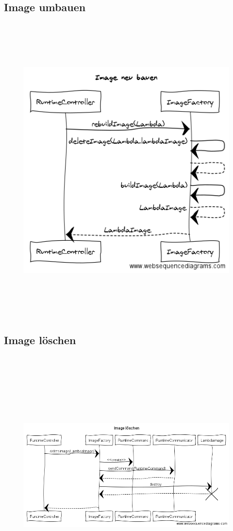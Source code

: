 \documentclass[a4paper,20pt,oneside]{book}
\begin{document}
\subsection{Image umbauen}
	\begin{figure}[!hb]
    \includegraphics[width=18cm,height=16cm]{rebuildImage}
\end{figure}
\newpage
\subsection{Image löschen}
	\begin{figure}[!hb]
    \includegraphics[width=18cm,height=13cm]{deleteImage}
\end{figure}
\newpage
\end{document}
